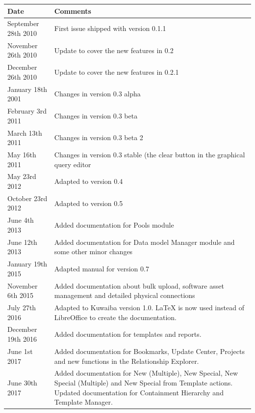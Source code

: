 \documentclass[a4paper]{article}
\begin{document}
		\begin{table}[h!]
			\centering
			\begin{tabular}{l||p{10cm}} %
				\toprule
				\textbf{Date} & \textbf{Comments}  \\
				\midrule
				September 28th 2010 & First issue shipped with version 0.1.1\\
				\midrule
				November 26th 2010 & Update to cover the new features in 0.2 \\
				\midrule
				December 26th 2010 & Update to cover the new features in 0.2.1 \\
				\midrule
				January 18th 2001 & Changes in version 0.3 alpha \\
				\midrule
				February 3rd 2011 & Changes in version 0.3 beta \\
				\midrule
				March 13th	2011 & Changes in version 0.3 beta 2 \\
				\midrule
				May 16th 2011 & Changes in version 0.3 stable (the clear button in the graphical query editor \\
				\midrule
				May 23rd 2012 & Adapted to version 0.4 \\
				\midrule
				October 23rd 2012 & Adapted to version 0.5 \\
				\midrule
				June 4th 2013 & Added documentation	for Pools module \\
				\midrule
				June 12th 2013 & Added documentation for Data model Manager module and some other minor changes\\
				\midrule
				January 19th 2015 & Adapted manual for version 0.7 \\
				\midrule
				November 6th 2015 & Added documentation about bulk upload, software asset management and detailed physical connections \\
				\midrule
				July 27th 2016 & Adapted to Kuwaiba version 1.0. LaTeX is now used instead of LibreOffice to create the documentation. \\
				\midrule
				December 19th 2016 & Added documentation for templates and reports.\\
				\midrule
				June 1st 2017 & Added documentation for Bookmarks, Update Center, Projects and new functions in the Relationship Explorer.\\
				\midrule
				June 30th 2017 & Added documentation for New (Multiple), New Special, New Special (Multiple) and New Special from Template actions. Updated documentation for Containment Hierarchy and Template Manager.\\
				\bottomrule
			\end{tabular}	
				
		\end{table}
	\newpage
\end{document}
